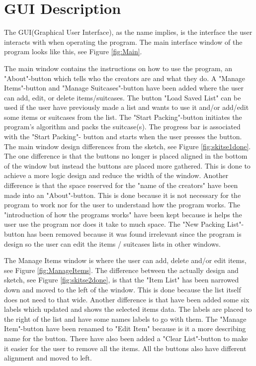 \section{GUI Description}
\label{sec:GUI}
The GUI(Graphical User Interface), as the name implies, is the interface the user interacts with when operating the program.
The main interface window of the program looks like this, see Figure \ref{fig:Main}.


The main window contains the instructions on how to use the program, an "About"-button which tells who the creators are and what they do. A "Manage Items"-button and "Manage Suitcases"-button have been added where the user can add, edit, or delete items/suitcases. The button "Load Saved List" can be used if the user have previously made a list and wants to use it and/or add/edit some items or suitcases from the list. The "Start Packing"-button initiates the program's algorithm and packs the suitcase(s). The progress bar is associated with the "Start Packing"- button and starts when the user presses the button.
The main window design differences from the sketch, see Figure \ref{fig:skitse1done}. The one difference is that the buttons no longer is placed aligned in the bottom of the window but instead the buttons are placed more gathered. This is done to achieve a more logic design and reduce the width of the window. Another difference is that the space reserved for the "name of the creators" have been made into an "About"-button. This is done because it is not necessary for the program to work nor for the user to understand how the program works. The "introduction of how the programs works" have been kept because is helps the user use the program nor does it take to much space.
The "New Packing List"-button has been removed because it was found irrelevant since the program is design so the user can edit the items / suitcases lists in other windows.

The Manage Items window is where the user can add, delete and/or edit items, see Figure \ref{fig:ManageItems}. The difference between the actually design and sketch, see Figure \ref{fig:skitse2done}, is that the "Item List" has been narrowed down and moved to the left of the window. This is done because the list itself does not need to that wide. Another difference is that have been added some six labels which updated and shows the selected items data. The labels are placed to the right of the list and have some names labels to go with them. The "Manage Item"-button have been renamed to "Edit Item" because is it a more describing name for the button. There have also been added a "Clear List"-button to make it easier for the user to remove all the items. All the buttons also have different alignment and moved to left.

